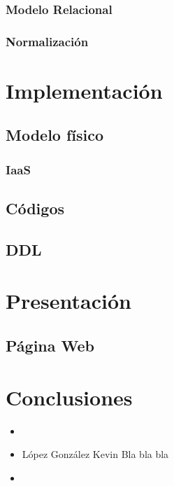\documentclass[12pt,letterpaper]{article}
\begin{document}
			\subsubsection{Modelo Relacional}
			
			\subsubsection{Normalización}
		
	\section{Implementación}
		\subsection{Modelo físico}
		
			\subsubsection{IaaS}
	
		\subsection{Códigos}
		
		\subsection{DDL}
	
	\section{Presentación}
		\subsection{Página Web}
	
	\section{Conclusiones}
		\begin{itemize}
			\item 
				\subitem 
				
			\item López González Kevin
				\subitem Bla bla bla

			\item 
				\subitem
		\end{itemize}
	
\end{document}
